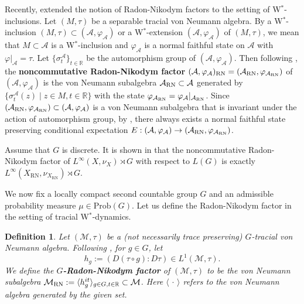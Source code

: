\documentclass[12pt]{amsart}
\newcommand{\R}{{\mathbb R}}
\newcommand{\cM}{{\mathcal M}}
\newcommand{\RN}{{\rm RN}}
\def\Prob{\mathrm{Prob}}
\def\CA{\mathcal{A}}
\newtheorem{definition}[thm]{Definition}
\theoremstyle{definition}
\begin{document}
Recently, \cite{Zh23} extended the notion of Radon-Nikodym factors to the setting of W$^*$-inclusions. Let $(M,\tau)$ be a separable tracial von Neumann algebra. By a W$^*$-inclusion $(M,\tau)\subset(\CA,\varphi_\CA)$ or a W$^*$-extension $(\CA,\varphi_\CA)$ of $(M,\tau)$, we mean that $M\subset\CA$ is a W$^*$-inclusion and $\varphi_\CA$ is a normal faithful state on $\CA$ with $\varphi|_\CA=\tau$. Let $\{\sigma_t^\CA\}_{t\in\R}$ be the automorphism group of $(\CA,\varphi_\CA)$. Then following \cite[Definition 3.4]{Zh23}, the \textbf{noncommutative Radon-Nikodym factor} $(\CA,\varphi_\CA)_\RN=(\CA_\RN,\varphi_{\CA_\RN})$ of $(\CA,\varphi_\CA)$ is the von Neumann subalgebra $\CA_\RN\subset\CA$ generated by $\{\sigma_t^\CA(z)\mid z\in M,t\in \R\}$ with the state $\varphi_{\CA_\RN}=\varphi_\CA|_{\CA_\RN}$. Since $(\CA_\RN,\varphi_{\CA_\RN})\subset(\CA,  \varphi_\CA)$ is a von Neumann subalgebra that is invariant under the action of automorphism group, by \cite[Theorem IX.4.2]{TakesakiBookII}, there always exists a normal faithful state preserving conditional expectation $E:(\CA,\varphi_\CA)\to(\CA_\RN,\varphi_{\CA_\RN})$.

Assume that $G$ is discrete. It is shown in \cite[Example 3.5]{Zh23} that the noncommutative Radon-Nikodym factor of $L^\infty(X,\nu_X)\rtimes G$ with respect to $L(G)$ is exactly $L^\infty(X_\mathrm{RN},\nu_{X_\mathrm{RN}})\rtimes G$.

We now fix a locally compact second countable group $G$ and an admissible probability measure $\mu\in\Prob(G)$. Let us define the Radon-Nikodym factor in the setting of tracial W$^*$-dynamics. 
\begin{definition}
\label{def:rnfactor}
Let $(\cM,\tau)$ be a (not necessarily trace preserving) $G$-tracial von Neumann algebra. Following \cite[Corollary 3.6]{TakesakiBookII}, for $g\in G$, let 
$$h_g:=(D(\tau\circ g):D\tau)\in L^1(\cM,\tau).$$
We define the \textbf{$G$-Radon-Nikodym factor} of $(\cM,\tau)$ to be the von Neumann subalgebra $\cM_\RN:=\langle h_g^{it}\rangle_{g\in G, t\in\R}\subset \cM$. Here $\langle\,\cdot \,\rangle$ refers to the von Neumann algebra generated by the given set.
\end{definition}
\end{document}
